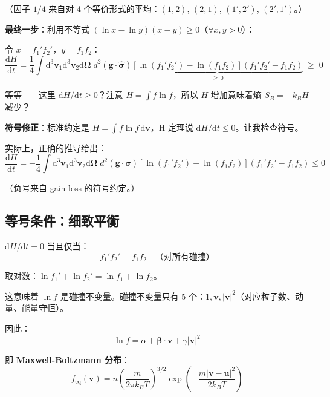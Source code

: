 \documentclass[11pt,a4paper]{article}
\newcommand{\vi}{\mathbf{v}}
\newcommand{\Om}{\boldsymbol{\Omega}}
\begin{document}
（因子 $1/4$ 来自对 4 个等价形式的平均：$(1,2)$, $(2,1)$, $(1',2')$, $(2',1')$。）

\textbf{最终一步}：利用不等式 $(\ln x - \ln y)(x - y) \ge 0$（$\forall x,y > 0$）：

令 $x = f_1'f_2'$，$y = f_1 f_2$：
\begin{equation}
\boxed{\frac{\mathrm{d} H}{\mathrm{d} t} = \frac{1}{4}\int\mathrm{d}^3\vi_1\mathrm{d}^3\vi_2\mathrm{d}\Om\; d^2(\mathbf{g}\cdot\hat{\boldsymbol{\sigma}})\underbrace{\left[\ln(f_1'f_2') - \ln(f_1 f_2)\right](f_1'f_2' - f_1 f_2)}_{\ge\, 0} \;\ge\; 0}
\end{equation}

等等——这里 $\mathrm{d} H/\mathrm{d} t \ge 0$？注意 $H = \int f\ln f$，所以 $H$ 增加意味着熵 $S_B = -k_BH$ 减少？

\textbf{符号修正}：标准约定是 $H = \int f\ln f\,\mathrm{d}\vi$，H 定理说 $\mathrm{d} H/\mathrm{d} t \le 0$。让我检查符号。

实际上，正确的推导给出：
\begin{equation}
\frac{\mathrm{d} H}{\mathrm{d} t} = -\frac{1}{4}\int\mathrm{d}^3\vi_1\mathrm{d}^3\vi_2\mathrm{d}\Om\; d^2(\mathbf{g}\cdot\hat{\boldsymbol{\sigma}})\left[\ln(f_1'f_2') - \ln(f_1 f_2)\right](f_1'f_2' - f_1 f_2) \le 0
\end{equation}

（负号来自 gain-loss 的符号约定。）

\subsection{等号条件：细致平衡}

$\mathrm{d} H/\mathrm{d} t = 0$ 当且仅当：
\begin{equation}
f_1' f_2' = f_1 f_2 \quad \text{（对所有碰撞）}
\end{equation}

取对数：$\ln f_1' + \ln f_2' = \ln f_1 + \ln f_2$。

这意味着 $\ln f$ 是碰撞不变量。碰撞不变量只有 5 个：$1, \vi, |\vi|^2$（对应粒子数、动量、能量守恒）。

因此：
\begin{equation}
\ln f = \alpha + \boldsymbol{\beta}\cdot\vi + \gamma|\vi|^2
\end{equation}

即 \textbf{Maxwell-Boltzmann 分布}：
\begin{equation}
f_{\text{eq}}(\vi) = n\left(\frac{m}{2\pi k_BT}\right)^{3/2}\exp\left(-\frac{m|\vi-\mathbf{u}|^2}{2k_BT}\right)
\end{equation}
\end{document}
